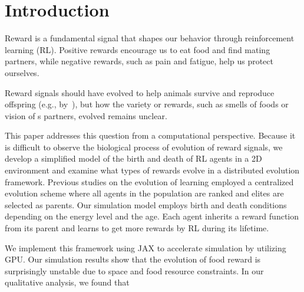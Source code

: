 \section{Introduction}\label{sec:intro}
Reward is a fundamental signal that shapes our behavior through reinforcement learning (RL).
Positive rewards encourage us to eat food and find mating partners, while negative rewards, such as pain and fatigue, help us protect ourselves.

Reward signals should have evolved to help animals survive and reproduce offspring (e.g., by~\cite{schultzNeuronalRewardDecision2015}), but how the variety or rewards, such as smells of foods or vision of s partners, evolved remains unclear.

This paper addresses this question from a computational perspective.
Because it is difficult to observe the biological process of evolution of reward signals, we develop a simplified model of the birth and death of RL agents in a 2D environment and examine what types of rewards evolve in a
distributed evolution framework.
Previous studies on the evolution of learning \citep{hintonHowLearningCan1987,singhWhereRewardsCome2009} employed a centralized evolution scheme where all agents in the population are ranked and elites are selected as parents.
Our simulation model employs birth and death conditions depending on the energy level and the age. Each agent inherits a reward function from its parent and learns to get more rewards by RL during its lifetime. %

We implement this framework using JAX\citep{jax2018github} to accelerate simulation by utilizing GPU. Our simulation results show that the evolution of food reward is surprisingly unstable due to space and food resource constraints. In our qualitative analysis, we found that

